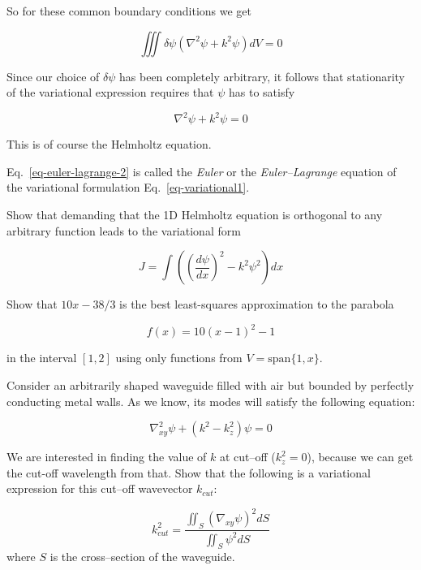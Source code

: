 So for these common boundary conditions we get

\begin{equation}
\iiint \delta \psi (\nabla^2 \psi + k^2 \psi ) dV = 0
\end{equation} 

Since our choice of $\delta \psi$ has been completely arbitrary, it follows that stationarity of the variational expression requires that $\psi$ has to satisfy

\begin{equation}
\nabla^2 \psi + k^2 \psi = 0 \label{eq-euler-lagrange-2}
\end{equation} 

This is of course the Helmholtz equation.

Eq.~\ref{eq-euler-lagrange-2} is called the \emph{Euler} or the \emph{Euler--Lagrange} equation of the variational formulation Eq.~\ref{eq-variational1}.


\begin{exer}
Show that demanding that the 1D Helmholtz equation is orthogonal to any arbitrary function leads to the variational form 

$$J = \int \left( \left(\frac{d \psi}{d x}\right)^2 - k^2 \psi^2 \right) dx$$

\end{exer}



\begin{exer}
Show that $10x-38/3$ is the best least-squares approximation to the parabola 

$$f(x) = 10(x-1)^2 -1$$ 

in the interval $[1,2]$ using only functions from $V = \mathrm{span} \{1, x\}$.

\end{exer}



\begin{exer}
Consider an arbitrarily shaped waveguide filled with air but bounded by perfectly conducting metal walls. As we know, its modes will satisfy the following equation:

$$ \nabla_{xy}^2 \psi + \left( k^2 - k_z^2 \right)\psi = 0 $$

We are interested in finding the value of $k$ at cut--off ($k_z^2=0$), because we can get the cut-off wavelength from that. Show that the following is a variational expression for this cut--off wavevector $k_{cut}$:

$$ k_{cut}^2 = \frac{\iint_S (\nabla_{xy} \psi)^2 dS}{\iint_S \psi^2 dS}$$
where $S$ is the cross--section of the waveguide.
\end{exer}



